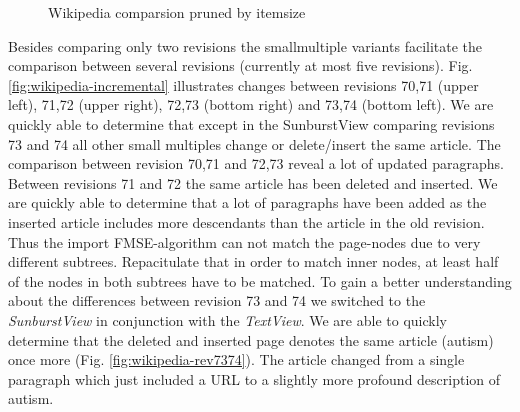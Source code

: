 \begin{figure}[htb]
\caption{\label{fig:wikivis-rev90106} Wikipedia comparsion pruned by itemsize}
\end{figure}

Besides comparing only two revisions the smallmultiple variants facilitate the comparison between several revisions (currently at most five revisions). Fig. \ref{fig:wikipedia-incremental} illustrates changes between revisions 70,71 (upper left), 71,72 (upper right), 72,73 (bottom right) and 73,74 (bottom left). We are quickly able to determine that except in the SunburstView comparing revisions 73 and 74 all other small multiples change or delete/insert the same article. The comparison between revision 70,71 and 72,73 reveal a lot of updated paragraphs. Between revisions 71 and 72 the same article has been deleted and inserted. We are quickly able to determine that a lot of paragraphs have been added as the inserted article includes more descendants than the article in the old revision. Thus the import FMSE-algorithm can not match the page-nodes due to very different subtrees. Repacitulate that in order to match inner nodes, at least half of the nodes in both subtrees have to be matched. To gain a better understanding about the differences between revision 73 and 74 we switched to the \emph{SunburstView} in conjunction with the \emph{TextView}. We are able to quickly determine that the deleted and inserted page denotes the same article (autism) once more (Fig. \ref{fig:wikipedia-rev7374}). The article changed from a single paragraph which just included a URL to a slightly more profound description of autism.

